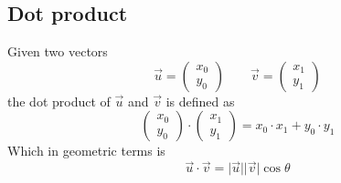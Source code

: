 \documentclass[12pt,t]{beamer}
\newcommand{\bi}{\begin{itemize}}
\newcommand{\ei}{\end{itemize}}
\begin{document}
\subsection{Dot product}
\begin{frame}
  \vspace{20pt}
  Given two vectors 
  \[
    \vec{u} = \begin{pmatrix} x_0 \\ y_0 \end{pmatrix} \quad\quad
    \vec{v} = \begin{pmatrix} x_1 \\ y_1 \end{pmatrix}
  \]
  the dot product of $\vec{u}$ and $\vec{v}$ is defined as 
  \[
    \begin{pmatrix} x_0 \\ y_0 \end{pmatrix} \cdot
    \begin{pmatrix} x_1 \\ y_1 \end{pmatrix} = 
    x_0 \cdot x_1 + y_0 \cdot y_1
  \]
  Which in geometric terms is
  \[
    \vec{u} \cdot \vec{v} = 
    \lvert \vec{u} \rvert \lvert \vec{v} \rvert \cos \theta
  \]
\end{frame}


\end{document}

